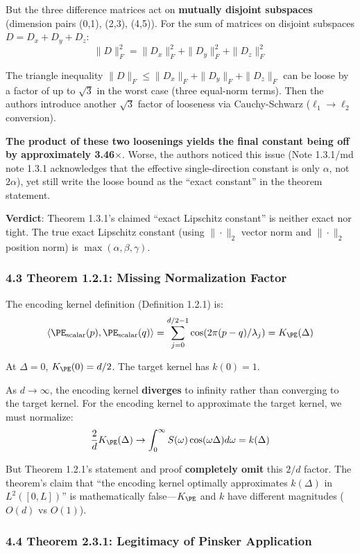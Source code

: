 \documentclass[
  12pt,
]{article}
\begin{document}
But the three difference matrices act on \textbf{mutually disjoint subspaces} (dimension pairs (0,1), (2,3), (4,5)). For the sum of matrices on disjoint subspaces \(D = D_x + D_y + D_z\):
\[\|D\|_F^2 = \|D_x\|_F^2 + \|D_y\|_F^2 + \|D_z\|_F^2\]

The triangle inequality \(\|D\|_F \leq \|D_x\|_F + \|D_y\|_F + \|D_z\|_F\)
can be loose by a factor of up to \(\sqrt{3}\) in the worst case (three equal-norm terms). Then the authors introduce another \(\sqrt{3}\) factor of looseness via Cauchy-Schwarz (\(\ell_1 \to \ell_2\) conversion).

\textbf{The product of these two loosenings yields the final constant being off by approximately 3.46$\times$}. Worse, the authors noticed this issue (Note 1.3.1/md note 1.3.1 acknowledges that the effective single-direction constant is only \(\alpha\), not \(2\alpha\)), yet still write the loose bound as the ``exact constant'' in the theorem statement.

\textbf{Verdict}: Theorem 1.3.1's claimed ``exact Lipschitz constant'' is neither exact nor tight. The true exact Lipschitz constant (using \(\|\cdot\|_2\) vector norm and \(\|\cdot\|_2\) position norm) is \(\max(\alpha, \beta, \gamma)\).

\subsubsection{4.3 Theorem 1.2.1: Missing Normalization Factor}\label{missing-normalization}

The encoding kernel definition (Definition 1.2.1) is:
\[\langle \PE_{\text{scalar}}(p), \PE_{\text{scalar}}(q) \rangle = \sum_{j=0}^{d/2-1} \cos(2\pi(p-q)/\lambda_j) = K_{\PE}(\Delta)\]

At \(\Delta = 0\), \(K_{\PE}(0) = d/2\). The target kernel has \(k(0) = 1\).

As \(d \to \infty\), the encoding kernel \textbf{diverges} to infinity rather than converging to the target kernel. For the encoding kernel to approximate the target kernel, we must normalize:
\[\frac{2}{d} K_{\PE}(\Delta) \to \int_0^\infty S(\omega)\cos(\omega\Delta)d\omega = k(\Delta)\]

But Theorem 1.2.1's statement and proof \textbf{completely omit} this \(2/d\) factor. The theorem's claim that ``the encoding kernel optimally approximates \(k(\Delta)\) in \(L^2([0,L])\)'' is mathematically false---\(K_{\PE}\) and \(k\) have different magnitudes (\(O(d)\) vs \(O(1)\)).

\subsubsection{4.4 Theorem 2.3.1: Legitimacy of Pinsker Application}\label{pinsker-legitimacy}
\end{document}
